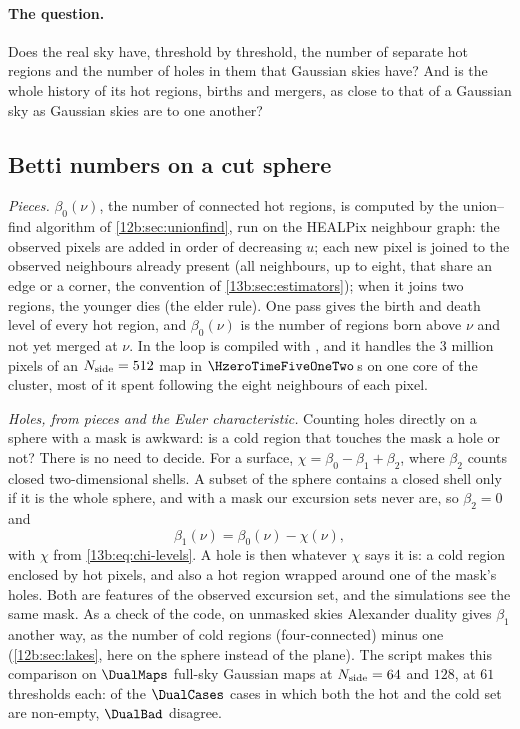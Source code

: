 \paragraph{The question.} Does the real sky have, threshold by threshold, the number of separate hot regions and
the number of holes in them that Gaussian skies have? And is the whole history of its hot regions, births and
mergers, as close to that of a Gaussian sky as Gaussian skies are to one another?

\subsection{Betti numbers on a cut sphere}
\label{13b:sec:betti-sphere}

\emph{Pieces.} $\beta_0(\nu)$, the number of connected hot regions, is computed by the union--find algorithm of
\cref{12b:sec:unionfind}, run on the HEALPix neighbour graph: the observed pixels are added in order of decreasing
$u$; each new pixel is joined to the observed neighbours already present (all neighbours, up to eight, that share an edge
or a corner, the convention of \cref{13b:sec:estimators}); when it joins two regions, the younger dies (the elder
rule). One pass gives the birth and death level of every hot region, and $\beta_0(\nu)$ is the number of regions
born above $\nu$ and not yet merged at $\nu$. In  the loop is compiled with
, and it handles the $3$ million pixels of an $N_{\rm side}=512$ map in $\HzeroTimeFiveOneTwo$\,s on one core of
the cluster, most of it spent following the eight neighbours of each pixel.

\emph{Holes, from pieces and the Euler characteristic.} Counting holes directly on a sphere with a mask is
awkward: is a cold region that touches the mask a hole or not? There is no need to decide. For a surface,
$\chi=\beta_0-\beta_1+\beta_2$, where $\beta_2$ counts closed two-dimensional shells. A subset of the sphere
contains a closed shell only if it is the whole sphere, and with a mask our excursion sets never are, so
$\beta_2=0$ and
\begin{equation}
  \beta_1(\nu)=\beta_0(\nu)-\chi(\nu),
  \label{13b:eq:b1}
\end{equation}
with $\chi$ from \eqref{13b:eq:chi-levels}. A hole is then whatever $\chi$ says it is: a cold region enclosed by hot
pixels, and also a hot region wrapped around one of the mask's holes. Both are features of the observed excursion
set, and the simulations see the same mask. As a check of the code, on unmasked skies Alexander duality gives
$\beta_1$ another way, as the number of cold regions (four-connected) minus one (\cref{12b:sec:lakes}, here on the
sphere instead of the plane). The script  makes this comparison on $\DualMaps$ full-sky
Gaussian maps at $N_{\rm side}=64$ and $128$, at $61$ thresholds each: of the $\DualCases$ cases in which both the hot
and the cold set are non-empty, $\DualBad$ disagree.

